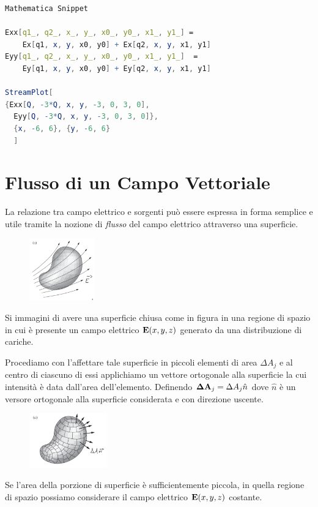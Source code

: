 \begin{lstlisting}[language = mathematica]
Mathematica Snippet 

Exx[q1_, q2_, x_, y_, x0_, y0_, x1_, y1_] = 
	Ex[q1, x, y, x0, y0] + Ex[q2, x, y, x1, y1]
Eyy[q1_, q2_, x_, y_, x0_, y0_, x1_, y1_]  = 
	Ey[q1, x, y, x0, y0] + Ey[q2, x, y, x1, y1]

StreamPlot[
{Exx[Q, -3*Q, x, y, -3, 0, 3, 0], 
  Eyy[Q, -3*Q, x, y, -3, 0, 3, 0]}, 
  {x, -6, 6}, {y, -6, 6}
  ]
\end{lstlisting}

\section{Flusso di un Campo Vettoriale}

La relazione tra campo elettrico e sorgenti pu\`o essere espressa in forma semplice e utile tramite la nozione di \textit{flusso} del campo elettrico attraverso una superficie.

\begin{figure}  %
    \centering
    \includegraphics[width=0.25\textwidth]{images/flux}  %
\end{figure}
\vspace{0.5cm}
\noindent Si immagini di avere una superficie chiusa come in figura in una regione di spazio in cui \`e presente un campo elettrico $\bold{E}(x,y,z)$ generato da una distribuzione di cariche. 

Procediamo con l'affettare tale superficie in piccoli elementi di area $\Delta A_j$ e al centro di ciascuno di essi applichiamo un vettore ortogonale alla superficie la cui intensit\`a \`e data dall'area dell'elemento. Definendo $\bold{\Delta A}_j = \Delta A_j\hat{n}$
dove $\hat{n}$ \`e un versore ortogonale alla superficie considerata e con direzione uscente.

\begin{figure}  %
    \centering
    \includegraphics[width=0.3\textwidth]{images/divide}  %
\end{figure}
Se l'area della porzione di superficie \`e sufficientemente piccola, in quella regione di spazio possiamo considerare il campo elettrico $\bold{E}(x,y,z)$ costante. 
\\

